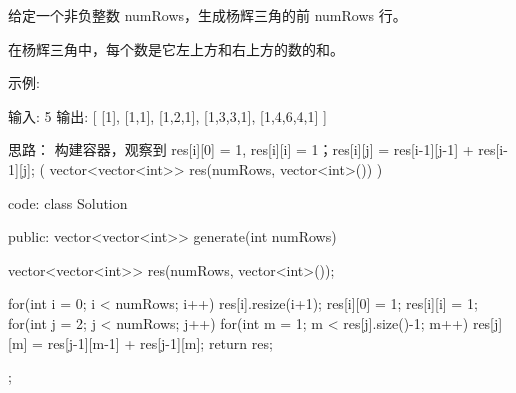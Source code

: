 给定一个非负整数 numRows，生成杨辉三角的前 numRows 行。

在杨辉三角中，每个数是它左上方和右上方的数的和。

示例:

输入: 5
输出:
[
     [1],
    [1,1],
   [1,2,1],
  [1,3,3,1],
 [1,4,6,4,1]
]




















思路：
构建容器，观察到 res[i][0] = 1, res[i][i] = 1；res[i][j] = res[i-1][j-1] + res[i-1][j];
(	vector<vector<int>> res(numRows, vector<int>())		)
























code:
class Solution {
public:
    vector<vector<int>> generate(int numRows) {
        vector<vector<int>> res(numRows, vector<int>());
        
        for(int i = 0; i < numRows; i++)
        {
            res[i].resize(i+1);
            res[i][0] = 1;
            res[i][i] = 1;
        }
        for(int j = 2; j < numRows; j++)
        {
            for(int m = 1; m < res[j].size()-1; m++)
            {
                res[j][m] = res[j-1][m-1] + res[j-1][m];
            }
        }
        return res;
    }
};